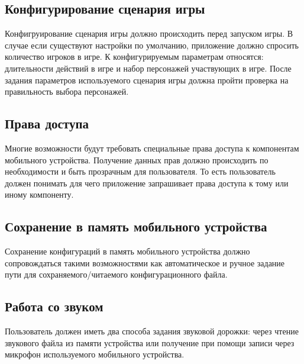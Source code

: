 \subsection{Конфигурирование сценария игры}

Конфигруирование сценария игры должно происходить перед запуском игры. В случае если существуют настройки по умолчанию, приложение должно спросить количество игроков в игре. К конфигурируемым параметрам относятся: длительности действий в игре и набор персонажей участвующих в игре. После задания параметров используемого сценария игры должна пройти проверка на правильность выбора персонажей.

\subsection{Права доступа}

Многие возможности будут требовать специальные права доступа к компонентам мобильного устройства. Получение данных прав должно происходить по необходимости и быть прозрачным для пользователя. То есть пользователь должен понимать для чего приложение запрашивает права доступа к тому или иному компоненту.

\subsection{Сохранение в память мобильного устройства}

Сохранение конфигураций в память мобильного устройства должно сопровождаться такими возможностями как автоматическое и ручное задание пути для сохраняемого/читаемого конфигурационного файла.

\subsection{Работа со звуком}

Пользователь должен иметь два способа задания звуковой дорожки: через чтение звукового файла из памяти устройства или получение при помощи записи через микрофон используемого мобильного устройства.
